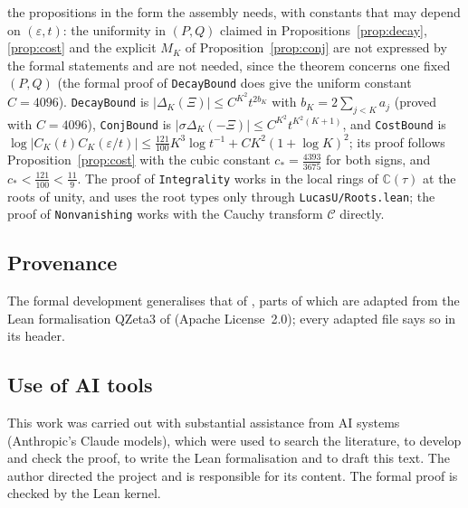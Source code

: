 \documentclass[11pt]{amsart}
\theoremstyle{definition}
\theoremstyle{remark}
\numberwithin{equation}{section}
\newcommand{\CC}{\mathbb{C}}
\newcommand{\cC}{\mathcal{C}}
\newcommand{\lean}[1]{{\def\_{\textunderscore\allowbreak}\texttt{#1}}}
\begin{document}
the propositions in the form the assembly needs, with constants that may depend on $(\varepsilon,t)$: the uniformity
in $(P,Q)$ claimed in Propositions~\ref{prop:decay}, \ref{prop:cost} and the explicit $M_K$ of
Proposition~\ref{prop:conj} are not expressed by the formal statements and are not needed, since the theorem
concerns one fixed $(P,Q)$ (the formal proof of \lean{DecayBound} does give the uniform constant $C=4096$).
\lean{DecayBound} is $|\Delta_K(\Xi)|\le C^{K^2}t^{2b_K}$ with $b_K=2\sum_{j<K}a_j$ (proved with $C=4096$),
\lean{ConjBound} is $|\sigma\Delta_K(-\Xi)|\le C^{K^2}t^{K^2(K+1)}$, and \lean{CostBound} is
$\log|C_K(t)C_K(\varepsilon/t)|\le\frac{121}{100}K^3\log t^{-1}+CK^2(1+\log K)^2$; its proof follows
Proposition~\ref{prop:cost} with the cubic constant $c_*=\frac{4393}{3675}$ for both signs, and
$c_*<\frac{121}{100}<\frac{11}9$. The proof of \lean{Integrality} works in the local rings of $\CC(\tau)$ at the roots
of unity, and uses the root types only through \lean{LucasU/Roots.lean}; the proof of \lean{Nonvanishing} works with the
Cauchy transform $\cC$ directly.

\subsection*{Provenance}
The formal development generalises that of \cite{Kri26}, parts of which are adapted from the Lean formalisation QZeta3
\cite{QZ3} of \cite{UPL} (Apache License~2.0); every adapted file says so in its header.

\subsection*{Use of AI tools}
This work was carried out with substantial assistance from AI systems (Anthropic's Claude models), which were used to
search the literature, to develop and check the proof, to write the Lean formalisation and to draft this text. The
author directed the project and is responsible for its content. The formal proof is checked by the Lean kernel.



\end{document}
